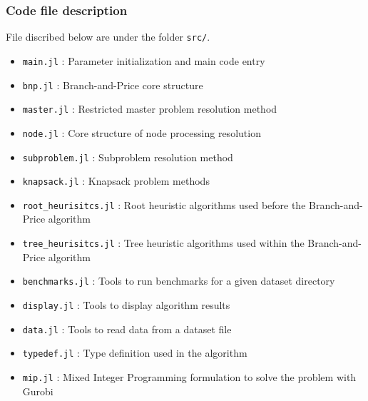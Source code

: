 \subsubsection{Code file description}
File discribed below are under the folder \texttt{src/}.
\begin{itemize}
	\item \texttt{main.jl} : Parameter initialization and main code entry
	\item \texttt{bnp.jl} : Branch-and-Price core structure
	\item \texttt{master.jl} : Restricted master problem resolution method
	\item \texttt{node.jl} : Core structure of node processing resolution
	\item \texttt{subproblem.jl} : Subproblem resolution method
	\item \texttt{knapsack.jl} : Knapsack problem methods
	\item \texttt{root\_heurisitcs.jl} : Root heuristic algorithms used before the Branch-and-Price algorithm
	\item \texttt{tree\_heurisitcs.jl} : Tree heuristic algorithms used within the Branch-and-Price algorithm
	\item \texttt{benchmarks.jl} : Tools to run benchmarks for a given dataset directory 
	\item \texttt{display.jl} : Tools to display algorithm results
	\item \texttt{data.jl} : Tools to read data from a dataset file
	\item \texttt{typedef.jl} : Type definition used in the algorithm
	\item \texttt{mip.jl} : Mixed Integer Programming formulation to solve the problem with Gurobi
\end{itemize}

